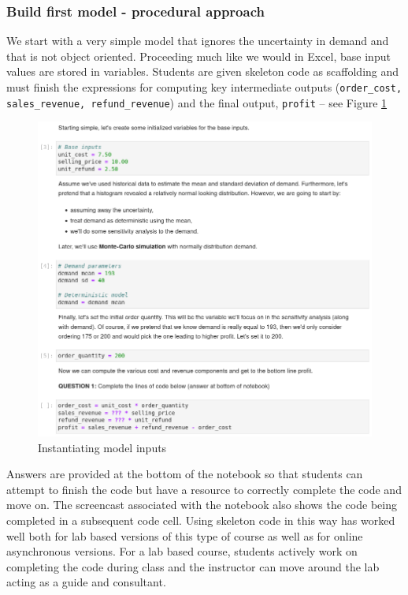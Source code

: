 \documentclass[ited,blindrev]{informs3}              %
\newcommand{\code}[1]{\texttt{#1}}
\begin{document}
\subsubsection{Build first model - procedural approach}
 
We start with a very simple model that ignores the uncertainty in demand and that is not object oriented. Proceeding much like we would in Excel, base input values are stored in variables. Students are given skeleton code as scaffolding and must finish the expressions for computing key intermediate outputs (\code{order\_cost, sales\_revenue, refund\_revenue}) and the final output, \code{profit} -- see Figure \ref{fig:model_inputs}


\begin{figure}[!htbp]
	\centering
	\includegraphics[scale=0.5]{images/model_inputs.png}
	\caption{Instantiating model inputs}
	\label{fig:model_inputs}
\end{figure}

Answers are provided at the bottom of the notebook so that students can attempt to finish the code but have a resource to correctly complete the code and move on. The screencast associated with the notebook also shows the code being completed in a subsequent code cell. Using skeleton code in this way has worked well both for lab based versions of this type of course as well as for online asynchronous versions. For a lab based course, students actively work on completing the code during class and the instructor can move around the lab acting as a guide and consultant.
\end{document}
